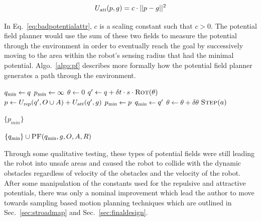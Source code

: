 \begin{equation}
    U_{\Var{att}}(p, g) = c \cdot ||p - g||^2
    \label{eq:badpotentialattr}
\end{equation}

In Eq.~\ref{eq:badpotentialattr}, $c$ is a scaling constant such that $c > 0$.
The potential field planner would use the sum of these two fields to measure
the potential through the environment in order to eventually reach the goal by
successively moving to the area within the robot's sensing radius that had the
minimal potential.  Algo.~\ref{algo:pf} describes more formally how the
potential field planner generates a path through the environment.

\begin{algorithm}[ht]

    \caption{$\Function{PF}(q, g, O, A, R)$}

    \label{algo:pf}
    \begin{algorithmic}[1]
        \setcounter{ALC@line}{0}
        \vspace*{1mm}

        \STATE $q_{\Var{min}} \leftarrow q$
        \STATE $p_{\Var{min}} \leftarrow \infty$
        \STATE $\theta \leftarrow 0$
        \WHILE {$\theta \leq 2\pi$}
            \STATE $q' \leftarrow q + \delta t \cdot s \cdot
            \Function{Rot}(\theta)$
            \STATE $p \leftarrow U_{\Var{rep}}(q', O \cup A)
            + U_{\Var{att}}(q', g)$
               \STATE $p_{\Var{min}} \leftarrow p$
                \STATE $q_{\Var{min}} \leftarrow q'$
            \ENDIF
            \STATE $\theta \leftarrow \theta + \delta \theta$
                \STATE $\Function{Step}(a)$
            \ENDFOR
        \ENDWHILE

            \RETURN $\{p_{min}\}$
        \ENDIF

        \RETURN $\{q_{\Var{min}}\} \cup \Function{PF}(q_{\Var{min}}, g, O, A, R)$
    \end{algorithmic}
\end{algorithm}

Through some qualitative testing, these types of potential fields were still
leading the robot into unsafe areas and caused the robot to collide with the
dynamic obstacles regardless of velocity of the obstacles and the velocity of
the robot. After some manipulation of the constants used for the repulsive and
attractive potentials, there was only a nominal improvement which lead the
author to move towards sampling based motion planning techniques which are
outlined in Sec.~\ref{sec:stroadmap} and Sec.~\ref{sec:finaldesign}.

